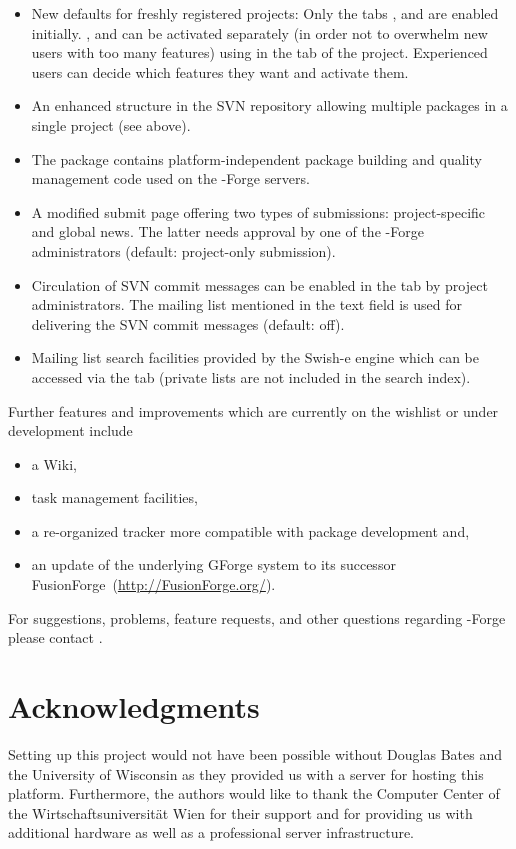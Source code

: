 \begin{itemize}
\item New defaults for freshly registered projects: Only the tabs
  ,  and  are enabled
  initially. ,  and 
  can be activated separately (in order not to overwhelm
  new users with too many features) using  in
  the  tab of the project. Experienced users can decide
  which features they want and activate them.
\item An enhanced structure in the SVN repository allowing multiple
  packages in a single project (see above).
\item The \R{} package  \citep{forge:theussl:2008}
  contains platform-independent package
  building and quality management code used on the \R{}-Forge servers.
\item A modified  submit page offering two types of
  submissions: project-specific and global news. The latter
  needs approval by one of the \R{}-Forge administrators (default:
  project-only submission).
\item Circulation of SVN commit messages can be enabled in the
   tab by project administrators. The mailing list mentioned in
  the text field is used for delivering the SVN commit messages
  (default: off).
\item Mailing list search facilities provided by the Swish-e engine
  which can be accessed via the  tab (private lists
  are not included in the search index).

\end{itemize}

Further features and improvements which are currently on the wishlist
or under development include

\begin{itemize}
\item a Wiki,
\item task management facilities,
\item a re-organized tracker more compatible with \R{} package
  development and,
\item an update of the underlying GForge system to its successor
  FusionForge~(\url{http://FusionForge.org/}).
\end{itemize}

For suggestions, problems, feature requests, and other questions regarding
\R{}-Forge please contact .

\section{Acknowledgments}

Setting up this project would not have been possible without Douglas
Bates and the University of Wisconsin as they provided us with a
server for hosting this platform. Furthermore,
the authors would like to thank the Computer Center
of the Wirtschaftsuniversit\"at Wien for
their support and for providing us with additional hardware as well as a
professional server infrastructure.


